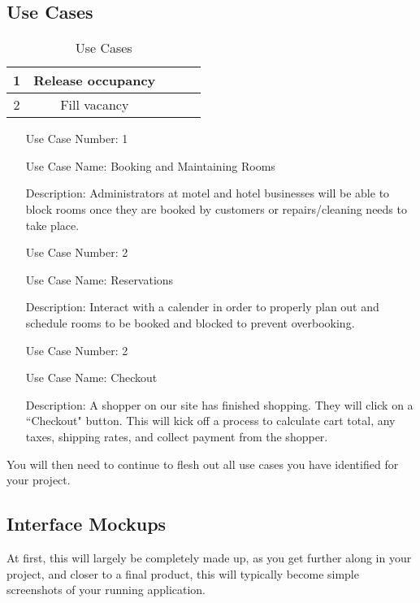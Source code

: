 \documentclass[10pt,conference,onecolumn,compsoc]{IEEEtran}
\begin{document}
\subsection{Use Cases}

\begin{table}
\centering
\begin{tabular}{|c|c|c|c|c|}
\hline
1 & Release occupancy\\
\hline \hline
2 & Fill vacancy\\
\hline

\end{tabular}
\caption{Use Cases}
\label{tab:useCaseIndex}
\end{table}


\begin{itemize}
\item[Use Case Number:] 1
\item[Use Case Name:] Booking and Maintaining Rooms
\item[Description:] Administrators at motel and hotel businesses will be able to block rooms once they are booked by customers or repairs/cleaning needs to take place.

\item[Use Case Number:] 2
\item[Use Case Name:] Reservations
\item[Description:] Interact with a calender in order to properly plan out and schedule rooms to be booked and blocked to prevent overbooking.
\end{itemize}

\begin{itemize}
\item[Use Case Number:] 2
\item[Use Case Name:] Checkout
\item[Description:] A shopper on our site has finished shopping.  They will click on a ``Checkout" button.  This will kick off a process to calculate cart total, any taxes, shipping rates, and collect payment from the shopper.

\end{itemize}

You will then need to continue to flesh out all use cases you have identified for your project.



\subsection{Interface Mockups}
At first, this will largely be completely made up, as you get further along in your project, and closer to a final product, this will typically become simple screenshots of your running application.
\end{document}
